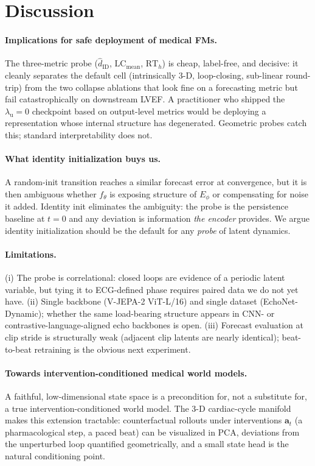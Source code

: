 \documentclass[runningheads]{llncs}
\begin{document}
\section{Discussion}

\paragraph{Implications for safe deployment of medical FMs.}
The three-metric probe ($\widehat{d}_\mathrm{ID}$,
$\mathrm{LC}_\mathrm{mean}$, $\mathrm{RT}_h$) is cheap, label-free, and
decisive: it cleanly separates the default cell (intrinsically $3$-D,
loop-closing, sub-linear round-trip) from the two collapse ablations
that look fine on a forecasting metric but fail catastrophically on
downstream LVEF. A practitioner who shipped the $\lambda_\mathrm{u}{=}0$
checkpoint based on output-level metrics would be deploying a
representation whose internal structure has degenerated. Geometric
probes catch this; standard interpretability does not.

\paragraph{What identity initialization buys us.}
A random-init transition reaches a similar forecast error at convergence,
but it is then ambiguous whether $f_\theta$ is exposing structure of
$E_\phi$ or compensating for noise it added. Identity init eliminates
the ambiguity: the probe is the persistence baseline at $t{=}0$ and any
deviation is information \emph{the encoder} provides. We argue identity
initialization should be the default for any \emph{probe} of latent
dynamics.

\paragraph{Limitations.}
(i) The probe is correlational: closed loops are evidence of a periodic
latent variable, but tying it to ECG-defined phase requires paired data
we do not yet have. (ii) Single backbone (V-JEPA-2 ViT-L/16) and single
dataset (EchoNet-Dynamic); whether the same load-bearing structure
appears in CNN- or contrastive-language-aligned echo backbones is open.
(iii) Forecast evaluation at clip stride is structurally weak (adjacent
clip latents are nearly identical); beat-to-beat retraining is the
obvious next experiment.

\paragraph{Towards intervention-conditioned medical world models.}
A faithful, low-dimensional state space is a precondition for, not a
substitute for, a true intervention-conditioned world model. The $3$-D
cardiac-cycle manifold makes this extension tractable: counterfactual
rollouts under interventions $\mathbf{a}_t$ (a pharmacological step, a
paced beat) can be visualized in PCA, deviations from the unperturbed
loop quantified geometrically, and a small state head is the natural
conditioning point.



\end{document}
